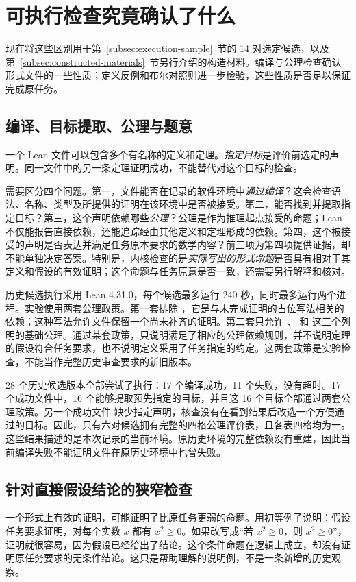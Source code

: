 \section{可执行检查究竟确认了什么}
\label{sec:audit}
现在将这些区别用于第~\ref{subsec:execution-sample}~节的 14 对选定候选，以及第~\ref{subsec:constructed-materials}~节另行介绍的构造材料。编译与公理检查确认形式文件的一些性质；定义反例和布尔对照则进一步检验，这些性质是否足以保证完成原任务。

\subsection{编译、目标提取、公理与题意}
\label{subsec:lean-checks}
一个 Lean 文件可以包含多个有名称的定义和定理。\emph{指定目标}是评价前选定的声明。同一文件中的另一条定理证明成功，不能替代对这个目标的检查。

需要区分四个问题。第一，文件能否在记录的软件环境中\emph{通过编译}？这会检查语法、名称、类型及所提供的证明在该环境中是否被接受。第二，能否找到并提取指定目标？第三，这个声明依赖哪些\emph{公理}？公理是作为推理起点接受的命题；Lean 不仅能报告直接依赖，还能追踪经由其他定义和定理形成的依赖。第四，这个被接受的声明是否表达并满足任务原本要求的数学内容？前三项为第四项提供证据，却不能单独决定答案。特别是，内核检查的是\emph{实际写出的形式命题}是否具有相对于其定义和假设的有效证明；这个命题与任务原意是否一致，还需要另行解释和核对\cite{leanaxioms,leanvalidation}。

历史候选执行采用 Lean 4.31.0，每个候选最多运行 240 秒，同时最多运行两个进程。实验使用两套公理政策。第一套排除 ，它是与未完成证明的占位写法相关的依赖；这种写法允许文件保留一个尚未补齐的证明。第二套只允许 、 和  这三个列明的基础公理。通过某套政策，只说明满足了相应的公理依赖规则，并不说明定理的假设符合任务要求，也不说明定义采用了任务指定的约定。这两套政策是实验检查，不能当作完整历史审查要求的新旧版本。

28 个历史候选版本全部尝试了执行：17 个编译成功，11 个失败，没有超时。17 个成功文件中，16 个能够提取预先指定的目标，并且这 16 个目标全部通过两套公理政策。另一个成功文件  缺少指定声明，核查没有在看到结果后改选一个方便通过的目标。因此，只有六对候选拥有完整的四格公理评价表，且各表四格均为一。这些结果描述的是本次记录的当前环境。原历史环境的完整依赖没有重建，因此当前编译失败不能证明文件在原历史环境中也曾失败。

\subsection{针对直接假设结论的狭窄检查}
\label{subsec:assumed-conclusion}
一个形式上有效的证明，可能证明了比原任务更弱的命题。用初等例子说明：假设任务要求证明，对每个实数 $x$ 都有 $x^2\geq 0$。如果改写成“若 $x^2\geq 0$，则 $x^2\geq 0$”，证明就很容易，因为假设已经给出了结论。这个条件命题在逻辑上成立，却没有证明原任务要求的无条件结论。这只是帮助理解的说明例，不是一条新增的历史观察。

